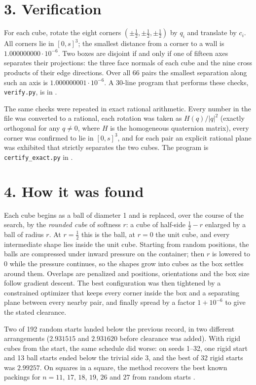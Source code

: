 \documentclass[11pt]{article}
\begin{document}
\section*{3. Verification}
For each cube, rotate the eight corners $(\pm\frac12,\pm\frac12,\pm\frac12)$ by $q_i$ and translate by $c_i$. All corners lie in $[0,s]^3$; the smallest distance from a corner to a wall is $1.000000000\cdot10^{-6}$. Two boxes are disjoint if and only if one of fifteen axes separates their projections: the three face normals of each cube and the nine cross products of their edge directions. Over all 66 pairs the smallest separation along such an axis is $1.000000001\cdot10^{-6}$. A 30-line program that performs these checks, \texttt{verify.py}, is in \cite{repo}.

The same checks were repeated in exact rational arithmetic. Every number in the file was converted to a rational, each rotation was taken as $H(q)/|q|^2$ (exactly orthogonal for any $q\ne0$, where $H$ is the homogeneous quaternion matrix), every corner was confirmed to lie in $[0,s]^3$, and for each pair an explicit rational plane was exhibited that strictly separates the two cubes. The program is \texttt{certify\_exact.py} in \cite{repo}.

\section*{4. How it was found}
Each cube begins as a ball of diameter 1 and is replaced, over the course of the search, by the \emph{rounded cube} of softness $r$: a cube of half-side $\frac12-r$ enlarged by a ball of radius $r$. At $r=\frac12$ this is the ball, at $r=0$ the unit cube, and every intermediate shape lies inside the unit cube. Starting from random positions, the balls are compressed under inward pressure on the container; then $r$ is lowered to $0$ while the pressure continues, so the shapes grow into cubes as the box settles around them. Overlaps are penalized and positions, orientations and the box size follow gradient descent. The best configuration was then tightened by a constrained optimizer that keeps every corner inside the box and a separating plane between every nearby pair, and finally spread by a factor $1+10^{-6}$ to give the stated clearance.

Two of 192 random starts landed below the previous record, in two different arrangements ($2.931515$ and $2.931620$ before clearance was added). With rigid cubes from the start, the same schedule did worse: on seeds 1--32, one rigid start and 13 ball starts ended below the trivial side 3, and the best of 32 rigid starts was $2.99257$. On squares in a square, the method recovers the best known packings for $n=11$, $17$, $18$, $19$, $26$ and $27$ from random starts \cite{repo}.
\end{document}
